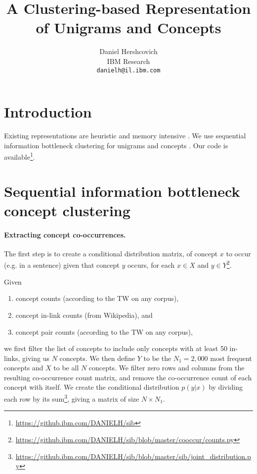 \documentclass{article}
\title{A Clustering-based Representation of Unigrams and Concepts}
\author{
  Daniel Hershcovich \\
  IBM Research\\
  \texttt{danielh@il.ibm.com} \\
}
\begin{document}
\maketitle

\begin{abstract}
\end{abstract}

\section{Introduction}

Existing representations are heuristic and memory intensive
\cite{mikolov2013efficient,pennington2014glove}.
We use sequential information bottleneck clustering for unigrams and concepts
\cite{slonim2000document}.
Our code is available\footnote{\url{https://github.ibm.com/DANIELH/sib}}.

\section{Sequential information bottleneck concept clustering}

\paragraph{Extracting concept co-occurrences.}

The first step is to create a conditional distribution matrix,
of concept $x$ to occur (e.g. in a sentence) given that concept $y$ occurs, for each
$x\in X$ and
$y\in Y$\footnote{\url{https://github.ibm.com/DANIELH/sib/blob/master/cooccur/counts.py}}.

Given
\begin{enumerate}
\item concept counts (according to the TW on any corpus),
\item concept in-link counts (from Wikipedia), and
\item concept pair counts (according to the TW on any corpus),
\end{enumerate}
we first filter the list of concepts to include only concepts with at least 50
in-links,
giving us $N$ concepts.
We then define $Y$ to be the $N_1=2,000$ most frequent concepts
and $X$ to be all $N$ concepts.
We filter zero rows and columns from the resulting co-occurrence count matrix,
and remove the co-occurrence count of each concept with itself.
We create the conditional distribution $p(y|x)$ by dividing each row by its
sum\footnote{\url{https://github.ibm.com/DANIELH/sib/blob/master/sib/joint_distribution.py}},
giving a matrix of size $N\times N_1$.
\end{document}
